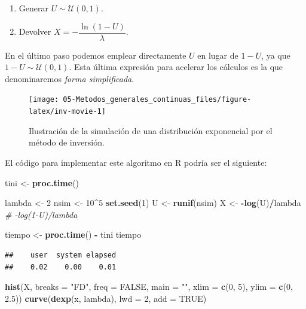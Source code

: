 \documentclass[
]{book}
\newenvironment{Shaded}{\begin{snugshade}}{\end{snugshade}}
\newcommand{\CommentTok}[1]{\textcolor[rgb]{0.56,0.35,0.01}{\textit{#1}}}
\newcommand{\DataTypeTok}[1]{\textcolor[rgb]{0.13,0.29,0.53}{#1}}
\newcommand{\DecValTok}[1]{\textcolor[rgb]{0.00,0.00,0.81}{#1}}
\newcommand{\FloatTok}[1]{\textcolor[rgb]{0.00,0.00,0.81}{#1}}
\newcommand{\KeywordTok}[1]{\textcolor[rgb]{0.13,0.29,0.53}{\textbf{#1}}}
\newcommand{\NormalTok}[1]{#1}
\newcommand{\OperatorTok}[1]{\textcolor[rgb]{0.81,0.36,0.00}{\textbf{#1}}}
\newcommand{\OtherTok}[1]{\textcolor[rgb]{0.56,0.35,0.01}{#1}}
\newcommand{\StringTok}[1]{\textcolor[rgb]{0.31,0.60,0.02}{#1}}
\theoremstyle{break}
\theoremstyle{definition}
\theoremstyle{definition}
\theoremstyle{definition}
\theoremstyle{remark}
\begin{document}
\begin{enumerate}
\def\labelenumi{\arabic{enumi}.}
\item
  Generar \(U \sim \mathcal{U}(0, 1)\).
\item
  Devolver \(X=-\dfrac{\ln \left( 1-U\right) }{\lambda }\).
\end{enumerate}

En el último paso podemos emplear directamente \(U\) en lugar de \(1-U\), ya que \(1 - U \sim \mathcal{U}(0, 1)\).
Esta última expresión para acelerar los cálculos es la que denominaremos \emph{forma simplificada}.

\begin{figure}[!htb]

{\centering \texttt{[image: 05-Metodos\_generales\_continuas\_files/figure-latex/inv-movie-1]} 

}

\caption{Ilustración de la simulación de una distribución exponencial por el método de inversión.}\label{fig:inv-movie}
\end{figure}

El código para implementar este algoritmo en R podría ser el siguiente:

\begin{Shaded}
\begin{Highlighting}[]
\NormalTok{tini <-}\StringTok{ }\KeywordTok{proc.time}\NormalTok{()}

\NormalTok{lambda <-}\StringTok{ }\DecValTok{2}
\NormalTok{nsim <-}\StringTok{ }\DecValTok{10}\OperatorTok{^}\DecValTok{5}
\KeywordTok{set.seed}\NormalTok{(}\DecValTok{1}\NormalTok{)}
\NormalTok{U <-}\StringTok{ }\KeywordTok{runif}\NormalTok{(nsim)}
\NormalTok{X <-}\StringTok{ }\OperatorTok{-}\KeywordTok{log}\NormalTok{(U)}\OperatorTok{/}\NormalTok{lambda }\CommentTok{# -log(1-U)/lambda}

\NormalTok{tiempo <-}\StringTok{ }\KeywordTok{proc.time}\NormalTok{() }\OperatorTok{-}\StringTok{ }\NormalTok{tini}
\NormalTok{tiempo}
\end{Highlighting}
\end{Shaded}

\begin{verbatim}
##    user  system elapsed 
##    0.02    0.00    0.01
\end{verbatim}

\begin{Shaded}
\begin{Highlighting}[]
\KeywordTok{hist}\NormalTok{(X, }\DataTypeTok{breaks =} \StringTok{"FD"}\NormalTok{, }\DataTypeTok{freq =} \OtherTok{FALSE}\NormalTok{, }
        \DataTypeTok{main =} \StringTok{""}\NormalTok{, }\DataTypeTok{xlim =} \KeywordTok{c}\NormalTok{(}\DecValTok{0}\NormalTok{, }\DecValTok{5}\NormalTok{), }\DataTypeTok{ylim =} \KeywordTok{c}\NormalTok{(}\DecValTok{0}\NormalTok{, }\FloatTok{2.5}\NormalTok{))}
\KeywordTok{curve}\NormalTok{(}\KeywordTok{dexp}\NormalTok{(x, lambda), }\DataTypeTok{lwd =} \DecValTok{2}\NormalTok{, }\DataTypeTok{add =} \OtherTok{TRUE}\NormalTok{)}
\end{Highlighting}
\end{Shaded}
\end{document}
